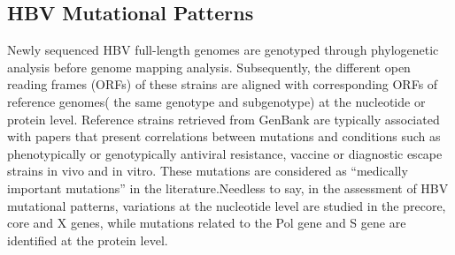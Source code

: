 \subsection{HBV Mutational Patterns}
Newly sequenced HBV full-length genomes are genotyped through phylogenetic analysis before genome mapping analysis. Subsequently, the different open reading frames (ORFs) of these strains are aligned with corresponding ORFs of reference genomes( the same genotype and subgenotype) at the nucleotide or protein level. Reference strains retrieved from GenBank are typically associated with papers that present correlations between mutations and conditions such as phenotypically or genotypically antiviral resistance, vaccine or diagnostic escape strains in vivo and in vitro. These mutations are considered as “medically important mutations” in the literature.Needless to say, in the assessment of HBV mutational patterns, variations at the nucleotide level are studied in the precore, core and X genes, while mutations related to the Pol gene and S gene are identified at the protein level.

